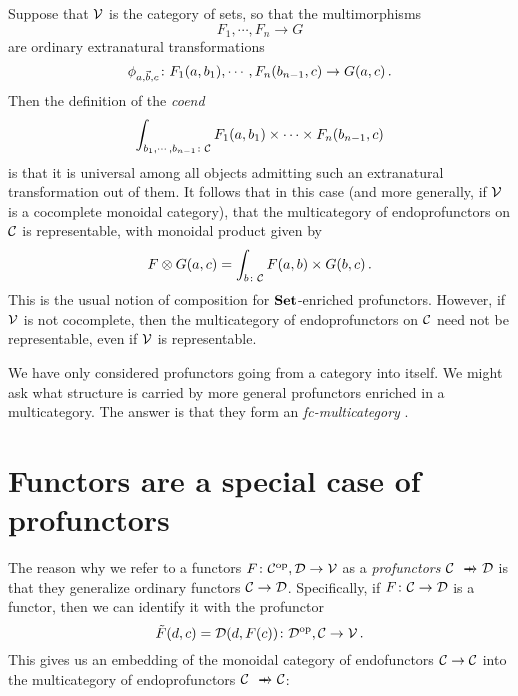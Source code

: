 \documentclass{report}[11pt]
\begin{document}
Suppose that ${\mathcal{V}}$ is the category of sets, so that the multimorphisms
\[
  F_1,\cdots,F_n \to G
  \]
are ordinary extranatural transformations
\[
  \phi_{a,\vec{b},c} \colon F_1(a,b_1),\cdots,F_n(b_{n-1},c) \to G(a,c)\,.
  \]
Then the definition of the \emph{coend}
\[
  \int_{b_1,\cdots,b_{n-1}\colon{\mathcal{C}}} F_1(a,b_1)\times\cdots\times F_n(b_{n-1},c)
  \]
is that it is universal among all objects admitting such an extranatural transformation out of them.  
It follows that in this case (and more generally, if ${\mathcal{V}}$ is a cocomplete monoidal category), that the multicategory of endoprofunctors on ${\mathcal{C}}$ is representable, with monoidal product given by
\[
  F\otimes G(a, c) = \int_{b\colon {\mathcal{C}}} F(a,b) \times G(b,c)\,.
  \]
This is the usual notion of composition for ${\normalfont\textbf{Set}}$-enriched profunctors.  
However, if ${\mathcal{V}}$ is not cocomplete, then the multicategory of endoprofunctors on ${\mathcal{C}}$ need not be representable, even if ${\mathcal{V}}$ is representable.

We have only considered profunctors going from a category into itself.  
We might ask what structure is carried by more general profunctors enriched in a multicategory.
The answer is that they form an \emph{fc-multicategory} \cite{Multicategories}.  

\section{Functors are a special case of profunctors}

The reason why we refer to a functors $F\colon {\mathcal{C}}^{\mathrm{op}},{\mathcal{D}} \to {\mathcal{V}}$ as a \emph{profunctors} $\C \pto \D$ is that they generalize ordinary functors ${\mathcal{C}} \to {\mathcal{D}}$.  
Specifically, if $F \colon {\mathcal{C}} \to {\mathcal{D}}$ is a functor, then we can identify it with the profunctor
\[
  \tilde{F}(d,c) = {\mathcal{D}}(d, F(c)) \colon {\mathcal{D}}^{\mathrm{op}}, {\mathcal{C}} \to {\mathcal{V}}\,.
  \]
This gives us an embedding of the monoidal category of endofunctors ${\mathcal{C}} \to {\mathcal{C}}$ into the multicategory of endoprofunctors $\C \pto \C$:
\end{document}
